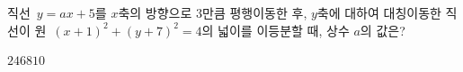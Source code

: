 직선~$y=ax+5$를 $x$축의 방향으로 $3$만큼 평행이동한 후, $y$축에 대하여 대칭이동한 직선이 원~$(x+1)^2+(y+7)^2=4$의 넓이를 이등분할 때, 상수 $a$의 값은?
\begin{choices32}{$2$}{$4$}{$6$}{$8$}{$10$}\end{choices32}
